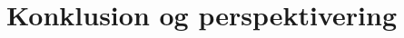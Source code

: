 \documentclass[../../SRP.tex]{subfiles}
\begin{document}
\chapter{Konklusion og perspektivering}
\end{document}
